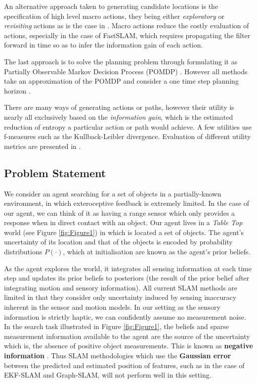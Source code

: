 \documentclass{frontiersSCNS} %
\begin{document}
An alternative approach taken to generating candidate locations is the specification of high level macro actions, they being either 
\textit{exploratory} or \textit{revisiting} actions as is the case in \cite{stachniss05robotics}. Macro actions
reduce the costly evaluation of actions, especially in the case of FastSLAM, which requires propagating the filter 
forward in time so as to infer the information gain of each action.

The last approach is to solve the planning problem through formulating it as  Partially Observable Markov Decision Process (POMDP) \cite{Ross08onlineplanning}. 
However all methods take an approximation of the POMDP and consider a one time step planning horizon \cite[p.37]{GeorgiosLidoris}.

There are many ways of generating actions or paths, however their utility is nearly all exclusively based on the \textit{information gain}, 
which is the estimated reduction of entropy a particular action or path would achieve. A few utilities use f-measures such as the Kullback-Leibler divergence. 
Evaluation of different utility metrics are presented in \cite{Active_SLAM_Uncertainty_compar,KL_SLAM_exploration_PF}.

\subsection{Problem Statement}

We consider an agent searching for a set of objects in a partially-known environment, in which exteroceptive feedback is extremely limited.
In the case of our agent, we can think of it as having a range sensor which only provides a response when in direct contact with an object. 
Our agent lives in a \textit{Table Top} world (see Figure \ref{fig:Figure1}) in which is located a set of objects.
The agent's uncertainty of its location and that of the objects is encoded by probability distributions $P(\cdot)$, which 
at initialisation are known as the agent's prior beliefs.


As the agent explores the world, it integrates all sensing information at each time step and updates its prior beliefs to posteriors
(the result of the prior belief after integrating motion and sensory information).
All current SLAM methods are limited in that they consider only uncertainty induced by sensing inaccuracy inherent in 
the sensor and motion models. In our setting as the sensory information is strictly haptic, we can confidently assume no measurement noise. 
In the search task illustrated in Figure \ref{fig:Figure1}, the beliefs and sparse measurement information available to the agent are 
the source of the uncertainty which is, the absence of positive object measurements. 
This is known as \textbf{negative information} \cite[p.313]{Thrun_Burgard_Fox_2005} \cite{Thrun02particlefilters,negative_info_markov_localisation}. 
Thus SLAM methodologies which use the \textbf{Gaussian error} between the predicted and estimated position of features, such as in the case 
of EKF-SLAM and Graph-SLAM, will not perform well in this setting.  
\end{document}
